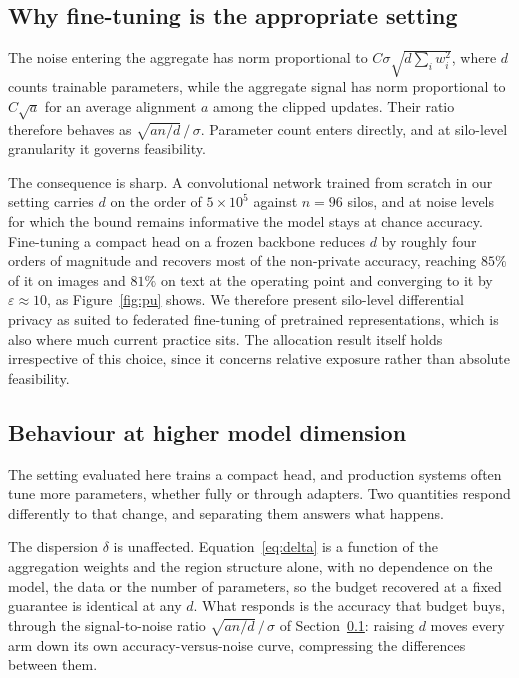 \documentclass[acmsmall,screen,review,anonymous]{acmart}
\theoremstyle{acmdefinition}%
\begin{document}
\subsection{Why fine-tuning is the appropriate setting}
\label{sec:finetune}

The noise entering the aggregate has norm proportional to $C \sigma \sqrt{d
\sum_i w_i^2}$, where $d$ counts trainable parameters, while the aggregate signal
has norm proportional to $C \sqrt{a}$ for an average alignment $a$ among the
clipped updates. Their ratio therefore behaves as $\sqrt{a n / d} \, / \, \sigma$.
Parameter count enters directly, and at silo-level granularity it governs
feasibility.

The consequence is sharp. A convolutional network trained from scratch in our
setting carries $d$ on the order of $5 \times 10^5$ against $n = 96$ silos, and at
noise levels for which the bound remains informative the model stays at chance
accuracy. Fine-tuning a compact head on a frozen backbone reduces $d$ by roughly
four orders of magnitude and recovers most of the non-private accuracy, reaching
$85\%$ of it on images and $81\%$ on text at the operating point and converging to it
by $\varepsilon \approx 10$, as Figure~\ref{fig:pu} shows. We therefore present silo-level differential
privacy as suited to federated fine-tuning of pretrained representations, which is
also where much current practice sits. The allocation result itself holds
irrespective of this choice, since it concerns relative exposure rather than
absolute feasibility.

\subsection{Behaviour at higher model dimension}
\label{sec:dimension}

The setting evaluated here trains a compact head, and production systems often tune
more parameters, whether fully or through adapters. Two quantities respond
differently to that change, and separating them answers what happens.

The dispersion $\delta$ is unaffected. Equation~\eqref{eq:delta} is a function of
the aggregation weights and the region structure alone, with no dependence on the
model, the data or the number of parameters, so the budget recovered at a fixed
guarantee is identical at any $d$. What responds is the accuracy that budget buys,
through the signal-to-noise ratio $\sqrt{an/d}\,/\,\sigma$ of
Section~\ref{sec:finetune}: raising $d$ moves every arm down its own
accuracy-versus-noise curve, compressing the differences between them.
\end{document}
